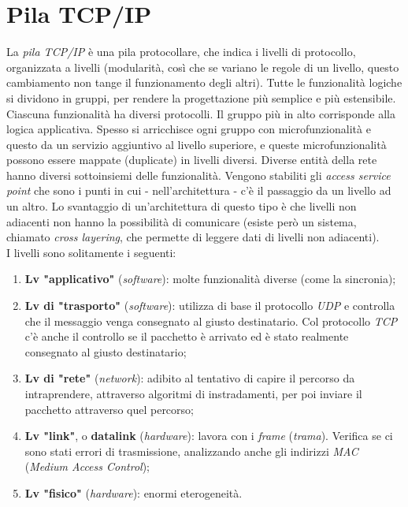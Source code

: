\section{Pila TCP/IP}
La \textit{pila TCP/IP} è una pila protocollare, che indica i livelli di protocollo, organizzata a livelli (modularità, così che se variano le regole di un livello, questo cambiamento non tange il funzionamento degli altri).
Tutte le funzionalità logiche si dividono in gruppi, per rendere la progettazione più semplice e più estensibile.
\\
Ciascuna funzionalità ha diversi protocolli.
Il gruppo più in alto corrisponde alla logica applicativa.
Spesso si arricchisce ogni gruppo con microfunzionalità e questo da un servizio aggiuntivo al livello superiore, e queste microfunzionalità possono essere mappate (duplicate) in livelli diversi.
Diverse entità della rete hanno diversi sottoinsiemi delle funzionalità.
Vengono stabiliti gli \textit{access service point} che sono i punti in cui - nell'architettura - c'è il passaggio da un livello ad un altro.
Lo svantaggio di un'architettura di questo tipo è che livelli non adiacenti non hanno la possibilità di comunicare (esiste però un sistema, chiamato \textit{cross layering}, che permette di leggere dati di livelli non adiacenti).
\\
I livelli sono solitamente i seguenti:
\begin{enumerate}
    \item \textbf{Lv "applicativo"} (\textit{software}): molte funzionalità diverse (come la sincronia);
    \item \textbf{Lv di "trasporto"} (\textit{software}): utilizza di base il protocollo \textit{UDP} e controlla che il messaggio venga consegnato al giusto destinatario. Col protocollo \textit{TCP} c'è anche il controllo se il pacchetto è arrivato ed è stato realmente consegnato al giusto destinatario;
    \item \textbf{Lv di "rete"} (\textit{network}): adibito al tentativo di capire il percorso da intraprendere, attraverso algoritmi di instradamenti, per poi inviare il pacchetto attraverso quel percorso;
    \item \textbf{Lv "link"}, o \textbf{datalink} (\textit{hardware}): lavora con i \textit{frame} (\textit{trama}). Verifica se ci sono stati errori di trasmissione, analizzando anche gli indirizzi \textit{MAC} (\textit{Medium Access Control});
    \item \textbf{Lv "fisico"} (\textit{hardware}): enormi eterogeneità.
\end{enumerate}
